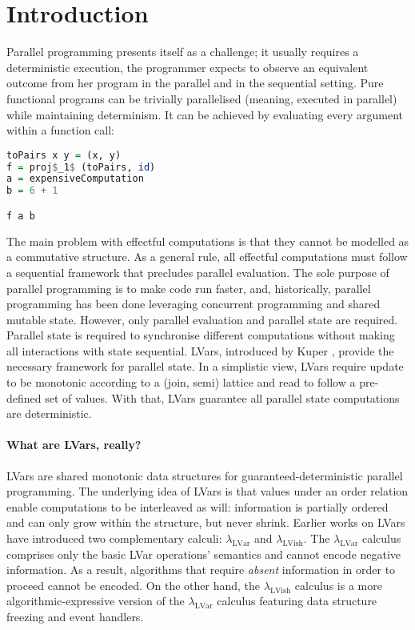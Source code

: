 \documentclass[main.tex]{subfiles}
\begin{document}
\section{Introduction}


Parallel programming presents itself as a challenge; it usually requires a deterministic execution, \ie the programmer expects to observe an equivalent outcome from her program in the parallel and in the sequential setting. Pure functional programs can be trivially parallelised (meaning, executed in parallel) while maintaining determinism. It can be achieved by evaluating every argument within a function call:

\begin{lstlisting}[language=Haskell]
toPairs x y = (x, y)
f = proj$_1$ (toPairs, id)
a = expensiveComputation
b = 6 + 1

f a b
\end{lstlisting}

The main problem with effectful computations is that they cannot be modelled as a commutative structure. As a general rule, all effectful computations must follow a sequential framework that precludes parallel evaluation. The sole purpose of parallel programming is to make code run faster, and, historically, parallel programming has been done leveraging concurrent programming and shared mutable state. However, only parallel evaluation and parallel state are required. Parallel state is required to synchronise different computations without making all interactions with state sequential. LVars, introduced by Kuper \cite{kuper15}, provide the necessary framework for parallel state. In a simplistic view, LVars require update to be monotonic according to a (join, semi) lattice and read to follow a pre-defined set of values. With that, LVars guarantee all parallel state computations are deterministic.

\paragraph{What are LVars, really?} LVars are shared monotonic data structures for guaranteed-deterministic parallel programming. The underlying idea of LVars is that values under an order relation enable computations to be interleaved as will: information is partially ordered and can only grow within the structure, but never shrink. Earlier works on LVars have introduced two complementary calculi: $\lambda_{\text{LVar}}$ and $\lambda_{\text{LVish}}$. The $\lambda_{\text{LVar}}$ calculus comprises only the basic LVar operations' semantics and cannot encode negative information. As a result, algorithms that require \textit{absent} information in order to proceed cannot be encoded. On the other hand, the $\lambda_{\text{LVish}}$ calculus is a more algorithmic-expressive version of the $\lambda_{\text{LVar}}$ calculus featuring data structure freezing and event handlers.
\end{document}
